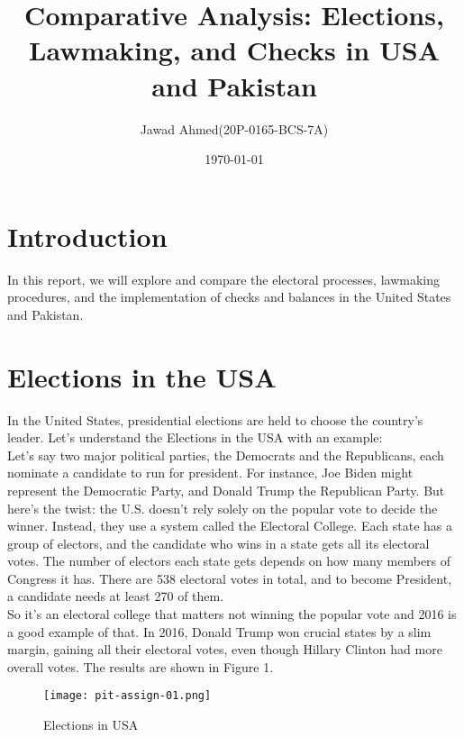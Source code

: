 \documentclass{article}
\title{Comparative Analysis: Elections, Lawmaking, and Checks in USA and Pakistan}
\author{Jawad Ahmed(20P-0165-BCS-7A)}
\date{\today}
\begin{document}
\maketitle

\section{Introduction}

In this report, we will explore and compare the electoral processes, lawmaking procedures, and the implementation of checks and balances in the United States and Pakistan.

\section{Elections in the USA}
In the United States, presidential elections are held to choose the country's leader.
Let's understand the Elections in the USA with an example:
\\
Let's say two major political parties, the Democrats and the Republicans, each nominate a candidate to run for president. For instance, Joe Biden might represent the Democratic Party, and Donald Trump the Republican Party. But here's the twist: the U.S. doesn't rely solely on the popular vote to decide the winner. Instead, they use a system called the Electoral College. Each state has a group of electors, and the candidate who wins in a state gets all its electoral votes. The number of electors each state gets depends on how many members of Congress it has.  There are 538 electoral votes in total, and to become President, a candidate needs at least 270 of them. 
\\
So it's an electoral college that matters not winning the popular vote and 2016 is a good example of that.  In 2016, Donald Trump won crucial states by a slim margin, gaining all their electoral votes, even though Hillary Clinton had more overall votes. The results are shown in Figure 1.

\begin{figure}
  \centering
  \texttt{[image: pit-assign-01.png]}
  \caption{Elections in USA}
  \label{fig:elections-in-usa}
\end{figure}
\end{document}
